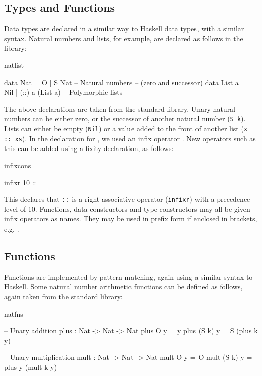 \subsection{Types and Functions}

Data types are declared in a similar way to Haskell data types, with a similar
syntax. Natural numbers and lists, for example, are declared as follows in the
library:

\begin{SaveVerbatim}{natlist}

data Nat    = O   | S Nat           -- Natural numbers
                                    -- (zero and successor)
data List a = Nil | (::) a (List a) -- Polymorphic lists

\end{SaveVerbatim}

\noindent
The above declarations are taken from the standard library. Unary natural
numbers can be either zero, or
the successor of another natural number (\texttt{S k}). 
Lists can either be empty (\texttt{Nil})
or a value added to the front of another list (\texttt{x :: xs}).
In the declaration for , we used an infix operator \tDC{::}. New operators
such as this can be added using a fixity declaration, as follows:

\begin{SaveVerbatim}{infixcons}

infixr 10 :: 

\end{SaveVerbatim}

\noindent
This declares that \texttt{::} is a right associative operator (\texttt{infixr})
with a precedence level of 10.
Functions, data constructors and type constructors may all be given infix
operators as names. They may be used in prefix form if enclosed in brackets,
e.g. \tDC{(::)}. 

\subsection{Functions}

Functions are implemented by pattern matching, again using a similar syntax to
Haskell. Some natural number arithmetic functions can be
defined as follows, again taken from the standard library:

\begin{SaveVerbatim}{natfns}

-- Unary addition
plus : Nat -> Nat -> Nat
plus O     y = y
plus (S k) y = S (plus k y)

-- Unary multiplication
mult : Nat -> Nat -> Nat
mult O     y = O
mult (S k) y = plus y (mult k y)

\end{SaveVerbatim}

